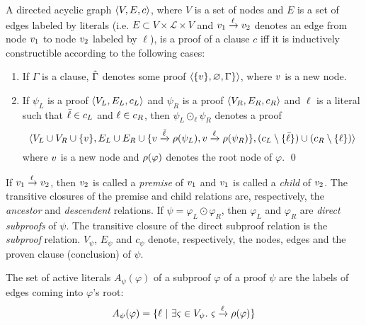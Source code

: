\documentclass{llncs}
\begin{document}
\begin{definition}[Proof] 
\label{def:proof}
A directed acyclic graph $\langle V, E, c \rangle$, where $V$ is a set of
nodes and $E$ is a set of edges labeled by literals (i.e. $E \subset V \times
\mathcal{L} \times V$ and $v_1 \xrightarrow{\ell} v_2$ denotes an edge from
node $v_1$ to node $v_2$ labeled by $\ell$), is a proof of a clause $c$ iff
it is inductively constructible according to the following cases:
%
\begin{enumerate}
  \item If $\Gamma$ is a clause, $\hat{\Gamma}$ denotes some proof $\langle \{ v \}, \varnothing, \Gamma \} \rangle$, where $v$ is a new node.
  \item If $\psi_L$ is a proof $\langle V_L, E_L, c_L \rangle$ and
    $\psi_R$ is a proof $\langle V_R, E_R, c_R \rangle$ and $\ell$ is a literal such that
    $\bar{\ell} \in c_L$ and $\ell \in c_R$, then
    $\psi_L \odot_\ell \psi_R$ denotes a proof 
    $$\langle 
    V_L \cup V_R \cup \{v \},
    E_L \cup E_R \cup \{v \xrightarrow{\bar{\ell}} \rho(\psi_L), v \xrightarrow{\ell} \rho(\psi_R)\}, 
    (c_L \setminus \{ \bar{\ell} \}) \cup (c_R \setminus \{ \ell \})
    \rangle$$
     where $v$ is a new node and $\rho(\varphi)$ denotes the root node of $\varphi$.
  \qed
\end{enumerate}
\end{definition}


\newcommand{\Vertices}[1]{V_{#1}}
\newcommand{\Edges}[1]{E_{#1}}
\newcommand{\Conclusion}[1]{c_{#1}}

\noindent
If $v_1 \xrightarrow{\ell} v_2$, then $v_2$ is called a \emph{premise} of $v_1$ and $v_1$ is called a \emph{child} of $v_2$. The transitive closures of the premise and child relations are, respectively, the \emph{ancestor} and \emph{descendent} relations. If $\psi = \varphi_L \odot \varphi_R$, then $\varphi_L$ and $\varphi_R$ are \emph{direct subproofs} of $\psi$. The transitive closure of the direct subproof relation is the \emph{subproof} relation.
$\Vertices{\psi}$, $\Edges{\psi}$ and $\Conclusion{\psi}$ denote, respectively, the nodes, edges and the proven clause (conclusion) of $\psi$.

\newcommand{\Active}[2]{A_{#2}(#1)}
\begin{definition}
The set of active literals $\Active{\varphi}{\psi}$ of a subproof $\varphi$ of a proof $\psi$
are the labels of edges coming into $\varphi$'s root: 
$$
\Active{\varphi}{\psi} = \{\ell \ | \ \exists \varsigma \in \Vertices{\psi}. \ \varsigma \xrightarrow{\ell} \raiz{\varphi} \}
$$
\end{definition}
\end{document}
